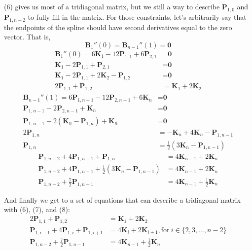 \documentclass[10pt]{article}
\begin{document}
	(6) gives us most of a tridiagonal matrix, but we still a way to describe $\textbf{P}_{1,0}$ and $\textbf{P}_{1,n-2}$ to fully fill in the matrix. For those constraints, let's arbitrarily say that the endpoints of the spline should have second derivatives equal to the zero vector. That is,
	$$\textbf{B}_{1}''(0) = \textbf{B}_{n-1}''(1) = \textbf{0}$$
	\begin{align}
		\textbf{B}_{1}''(0) = 6\textbf{K}_{1} - 12\textbf{P}_{1,1} + 6\textbf{P}_{2,1} &= \textbf{0}\nonumber\\
		\textbf{K}_{1} - 2\textbf{P}_{1,1} + \textbf{P}_{2,1} &= \textbf{0}\nonumber\\
		\textbf{K}_{1} - 2\textbf{P}_{1,1} + 2\textbf{K}_{2} - \textbf{P}_{1,2} &= \textbf{0}\nonumber\\
		2\textbf{P}_{1,1} + \textbf{P}_{1,2} &= \textbf{K}_{1} + 2\textbf{K}_{2}
	\end{align}
	\begin{align*}
		\textbf{B}_{n-1}''(1) = 6\textbf{P}_{1,n-1} - 12\textbf{P}_{2,n-1} + 6\textbf{K}_{n} &= \textbf{0}\\
		\textbf{P}_{1,n-1} - 2\textbf{P}_{2,n-1} + \textbf{K}_{n} &= \textbf{0}\\
		\textbf{P}_{1,n-1} - 2(\textbf{K}_{n} - \textbf{P}_{1,n}) + \textbf{K}_{n} &= \textbf{0}\\
		2\textbf{P}_{1,n} &= -\textbf{K}_{n} + 4\textbf{K}_{n} - \textbf{P}_{1,n-1}\\
		\textbf{P}_{1,n} &= \frac{1}{2}(3\textbf{K}_{n} - \textbf{P}_{1,n-1})
	\end{align*}
	\begin{align}
		\textbf{P}_{1,n-2} + 4\textbf{P}_{1,n-1} + \textbf{P}_{1,n} &= 4\textbf{K}_{n-1} + 2\textbf{K}_{n}\nonumber\\
		\textbf{P}_{1,n-2} + 4\textbf{P}_{1,n-1} + \frac{1}{2}(3\textbf{K}_{n} - \textbf{P}_{1,n-1}) &= 4\textbf{K}_{n-1} + 2\textbf{K}_{n}\nonumber\\
		\textbf{P}_{1,n-2} + \frac{7}{2}\textbf{P}_{1,n-1} &= 4\textbf{K}_{n-1} + \frac{1}{2}\textbf{K}_{n}
	\end{align}

	And finally we get to a set of equations that can describe a tridiagonal matrix with (6), (7), and (8):
	\begin{align*}
		2\textbf{P}_{1,1} + \textbf{P}_{1,2} &= \textbf{K}_{1} + 2\textbf{K}_{2}\\
		\textbf{P}_{1,i-1} + 4\textbf{P}_{1,i} + \textbf{P}_{1,i+1} &= 4\textbf{K}_{i} + 2\textbf{K}_{i+1}, \mathrm{for\ } i \in \{2, 3, \dots, n-2\}\\
		\textbf{P}_{1,n-2} + \frac{7}{2}\textbf{P}_{1,n-1} &= 4\textbf{K}_{n-1} + \frac{1}{2}\textbf{K}_{n}
	\end{align*}
\end{document}

